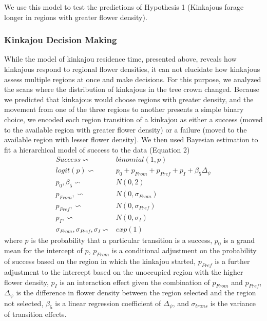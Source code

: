 \documentclass[twoside,12pt,final]{ucthesis-CA2012}
\begin{document}
\begin{ucmainmatter}
We use this model to test the predictions of Hypothesis 1 (Kinkajous forage longer in regions with greater flower density).

\hypertarget{kinkajou-decision-making}{%
\subsubsection{Kinkajou Decision Making}\label{kinkajou-decision-making}}

While the model of kinkajou residence time, presented above, reveals how kinkajous respond to regional flower densities, it can not elucidate how kinkajous assess multiple regions at once and make decisions. For this purpose, we analyzed the scans where the distribution of kinkajous in the tree crown changed. Because we predicted that kinkajous would choose regions with greater density, and the movement from one of the three regions to another presents a simple binary choice, we encoded each region transition of a kinkajou as either a success (moved to the available region with greater flower density) or a failure (moved to the available region with lesser flower density). We then used Bayesian estimation to fit a hierarchical model of success to the data (Equation 2)
\begin{align*}
Success \backsim{}& binomial(1, p) \\
logit(p) \backsim{}& p_0 + p_{From} + p_{Pref} + p_{I} + \beta_5\Delta_\psi \\
p_0, \beta_5 \backsim{}& N(0,2) \\
p_{From}, \backsim{}& N(0, \sigma_{From}) \\
p_{Pref}, \backsim{}& N(0, \sigma_{Pref}) \\
p_{I}, \backsim{}& N(0, \sigma_{I}) \\ 
\sigma_{From}, \sigma_{Pref}, \sigma_{I} \backsim{}& exp(1)
\end{align*}
where \(p\) is the probability that a particular transition is a success, \(p_0\) is a grand mean for the intercept of \(p\), \(p_{From}\) is a conditional adjustment on the probability of success based on the region in which the kinkajou started, \(p_{Pref}\) is a further adjustment to the intercept based on the unoccupied region with the higher flower density, \(p_I\) is an interaction effect given the combination of \(p_{From}\) and \(p_{Pref}\), \(\Delta_{\psi}\) is the difference in flower density between the region selected and the region not selected, \(\beta_5\) is a linear regression coefficient of \(\Delta_{\psi}\), and \(\sigma_{trans}\) is the variance of transition effects.


\end{ucmainmatter}
\end{document}
